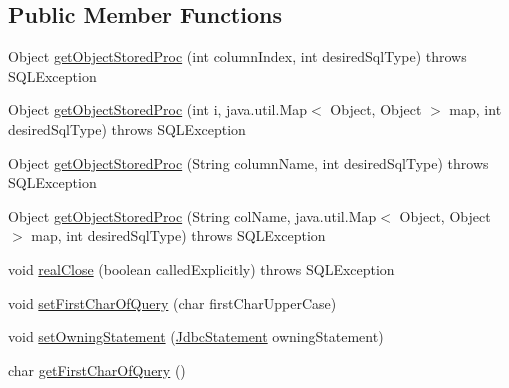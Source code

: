 \subsection*{Public Member Functions}
\begin{DoxyCompactItemize}
\item 
Object \mbox{\hyperlink{interfacecom_1_1mysql_1_1cj_1_1jdbc_1_1result_1_1_result_set_internal_methods_a2a06ef27f3e32523ff5d6b8e04f7586b}{get\+Object\+Stored\+Proc}} (int column\+Index, int desired\+Sql\+Type)  throws S\+Q\+L\+Exception
\item 
Object \mbox{\hyperlink{interfacecom_1_1mysql_1_1cj_1_1jdbc_1_1result_1_1_result_set_internal_methods_ab099352f36bb8af21d47fbfebe9a515a}{get\+Object\+Stored\+Proc}} (int i, java.\+util.\+Map$<$ Object, Object $>$ map, int desired\+Sql\+Type)  throws S\+Q\+L\+Exception
\item 
Object \mbox{\hyperlink{interfacecom_1_1mysql_1_1cj_1_1jdbc_1_1result_1_1_result_set_internal_methods_a403c7181f28d44398e8ba4865edf8fb0}{get\+Object\+Stored\+Proc}} (String column\+Name, int desired\+Sql\+Type)  throws S\+Q\+L\+Exception
\item 
Object \mbox{\hyperlink{interfacecom_1_1mysql_1_1cj_1_1jdbc_1_1result_1_1_result_set_internal_methods_a435054bb5cb1913347350cbbb21fa591}{get\+Object\+Stored\+Proc}} (String col\+Name, java.\+util.\+Map$<$ Object, Object $>$ map, int desired\+Sql\+Type)  throws S\+Q\+L\+Exception
\item 
void \mbox{\hyperlink{interfacecom_1_1mysql_1_1cj_1_1jdbc_1_1result_1_1_result_set_internal_methods_a0102042bd0710772308db537f40e2286}{real\+Close}} (boolean called\+Explicitly)  throws S\+Q\+L\+Exception
\item 
void \mbox{\hyperlink{interfacecom_1_1mysql_1_1cj_1_1jdbc_1_1result_1_1_result_set_internal_methods_a0cf0d8b631bb6bc7a7453ee35399889f}{set\+First\+Char\+Of\+Query}} (char first\+Char\+Upper\+Case)
\item 
void \mbox{\hyperlink{interfacecom_1_1mysql_1_1cj_1_1jdbc_1_1result_1_1_result_set_internal_methods_aaa893384996564b579f90c25c1c0e8c1}{set\+Owning\+Statement}} (\mbox{\hyperlink{interfacecom_1_1mysql_1_1cj_1_1jdbc_1_1_jdbc_statement}{Jdbc\+Statement}} owning\+Statement)
\item 
char \mbox{\hyperlink{interfacecom_1_1mysql_1_1cj_1_1jdbc_1_1result_1_1_result_set_internal_methods_ab58d42f08a9145dcff574389fcb697ff}{get\+First\+Char\+Of\+Query}} ()
\item 
\mbox{\label{interfacecom_1_1mysql_1_1cj_1_1jdbc_1_1result_1_1_result_set_internal_methods_ae1258b1e6de19952cd438a340122cc81}} 

\end{DoxyCompactItemize}
